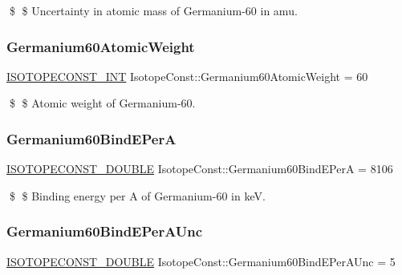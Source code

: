 \$ \$ Uncertainty in atomic mass of Germanium-\/60 in amu. \mbox{\label{group___isotope_const-_germanium-_ge60_gaaafa0b7078ce1e7d95b243c021289535}} 
\subsubsection{\texorpdfstring{Germanium60\+Atomic\+Weight}{Germanium60AtomicWeight}}
{\footnotesize\ttfamily \mbox{\hyperlink{group___isotope_const-_macros_ga5f18360b3e99483a35c32d789e62621c}{I\+S\+O\+T\+O\+P\+E\+C\+O\+N\+S\+T\+\_\+\+I\+NT}} Isotope\+Const\+::\+Germanium60\+Atomic\+Weight = 60}

\$ \$ Atomic weight of Germanium-\/60. \mbox{\label{group___isotope_const-_germanium-_ge60_gadbb6171ee682b934a3ada4f56bd81917}} 
\subsubsection{\texorpdfstring{Germanium60\+Bind\+E\+PerA}{Germanium60BindEPerA}}
{\footnotesize\ttfamily \mbox{\hyperlink{group___isotope_const-_macros_ga8f45a7272ce02c0b4c65c44636ed719a}{I\+S\+O\+T\+O\+P\+E\+C\+O\+N\+S\+T\+\_\+\+D\+O\+U\+B\+LE}} Isotope\+Const\+::\+Germanium60\+Bind\+E\+PerA = 8106}

\$ \$ Binding energy per A of Germanium-\/60 in keV. \mbox{\label{group___isotope_const-_germanium-_ge60_ga90b920cfecf97f54d517a28a1adfc978}} 
\subsubsection{\texorpdfstring{Germanium60\+Bind\+E\+Per\+A\+Unc}{Germanium60BindEPerAUnc}}
{\footnotesize\ttfamily \mbox{\hyperlink{group___isotope_const-_macros_ga8f45a7272ce02c0b4c65c44636ed719a}{I\+S\+O\+T\+O\+P\+E\+C\+O\+N\+S\+T\+\_\+\+D\+O\+U\+B\+LE}} Isotope\+Const\+::\+Germanium60\+Bind\+E\+Per\+A\+Unc = 5}

